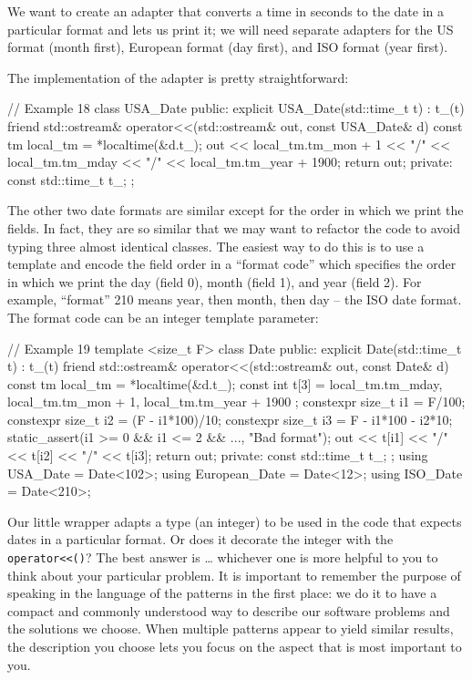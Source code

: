 We want to create an adapter that converts a time in seconds to the date in a particular format and lets us print it; we will need separate adapters for the US format (month first), European format (day first), and ISO format (year first).

The implementation of the adapter is pretty straightforward:

\begin{code}
// Example 18
class USA_Date {
  public:
  explicit USA_Date(std::time_t t) : t_(t) {}
  friend std::ostream& operator<<(std::ostream& out,
                                  const USA_Date& d) {
    const tm local_tm = *localtime(&d.t_);
    out << local_tm.tm_mon + 1 << "/" <<
           local_tm.tm_mday << "/" <<
           local_tm.tm_year + 1900;
    return out;
  }
  private:
  const std::time_t t_;
};
\end{code}

The other two date formats are similar except for the order in which we print the fields. In fact, they are so similar that we may want to refactor the code to avoid typing three almost identical classes. The easiest way to do this is to use a template and encode the field order in a ``format code'' which specifies the order in which we print the day (field 0), month (field 1), and year (field 2). For example, ``format'' 210 means year, then month, then day -- the ISO date format. The format code can be an integer template parameter:

\begin{code}
// Example 19
template <size_t F> class Date {
  public:
  explicit Date(std::time_t t) : t_(t) {}
  friend std::ostream& operator<<(std::ostream& out,
                                  const Date& d) {
    const tm local_tm = *localtime(&d.t_);
    const int t[3] = { local_tm.tm_mday,
                       local_tm.tm_mon + 1,
                       local_tm.tm_year + 1900 };
    constexpr size_t i1 = F/100;
    constexpr size_t i2 = (F - i1*100)/10;
    constexpr size_t i3 = F - i1*100 - i2*10;
    static_assert(i1 >= 0 && i1 <= 2 && ..., "Bad format");
    out << t[i1] << "/" << t[i2] << "/" << t[i3];
    return out;
  }
  private:
  const std::time_t t_;
};
using USA_Date = Date<102>;
using European_Date = Date<12>;
using ISO_Date = Date<210>;
\end{code}

Our little wrapper adapts a type (an integer) to be used in the code that expects dates in a particular format. Or does it decorate the integer with the \texttt{operator\textless{}\textless{}()}? The best answer is \ldots{} whichever one is more helpful to you to think about your particular problem. It is important to remember the purpose of speaking in the language of the patterns in the first place: we do it to have a compact and commonly understood way to describe our software problems and the solutions we choose. When multiple patterns appear to yield similar results, the description you choose lets you focus on the aspect that is most important to you.

